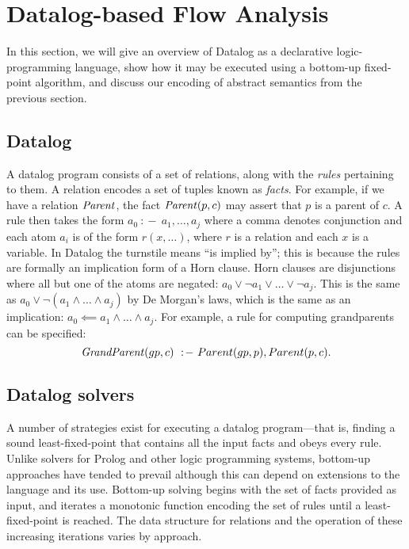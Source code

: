 

\section{Datalog-based Flow Analysis}
%
In this section, we will give an overview of Datalog as a declarative logic-programming
language, show how it may be executed using a bottom-up fixed-point algorithm, and discuss
our encoding of abstract semantics from the previous section.
%



\subsection{Datalog}
%
A datalog program consists of a set of relations, along with the \textit{rules}
pertaining to them.
%
A relation encodes a set of tuples known as \textit{facts}.
%
For example, if we have a relation $\mathit{Parent}$, the fact $\mathit{Parent}(p,c)$
may assert that $p$ is a parent of $c$.
%
A rule then takes the form $a_0\ :\!-\ a_1, \ldots, a_j$ where a comma denotes conjunction and
each atom $a_i$ is of the form $r(x, \ldots)$, where $r$ is a relation and each $x$ is a variable.
%
In Datalog the turnstile means ``is implied by''; this is because the rules are formally an implication
form of a Horn clause.
%
Horn clauses are disjunctions where all but one of the atoms are negated: $a_0 \vee \neg a_1 \vee \ldots \vee \neg a_j$.
%
This is the same as $a_0 \vee \neg (a_1 \wedge \ldots \wedge a_j)$ by De Morgan's laws, which is the same as an implication:
$a_0 \impliedby a_1 \wedge \ldots \wedge a_j$.
%
%
For example, a rule for computing grandparents can be specified:
%
\[
  \mathit{GrandParent}(gp, c)\ :\!-\ Parent(gp, p), Parent(p, c).
\]





\subsection{Datalog solvers}
%
A number of strategies exist for executing a datalog program---that is, finding a sound least-fixed-point
that contains all the input facts and obeys every rule.
%
Unlike solvers for Prolog and other logic programming systems, bottom-up approaches have tended to prevail
\cite{ullman:1989:bottomup} although this can depend on extensions to the language and its use.
%
Bottom-up solving begins with the set of facts provided as input, and iterates a monotonic function
encoding the set of rules until a least-fixed-point is reached.
%
The data structure for relations and the operation of these increasing iterations varies by approach.


